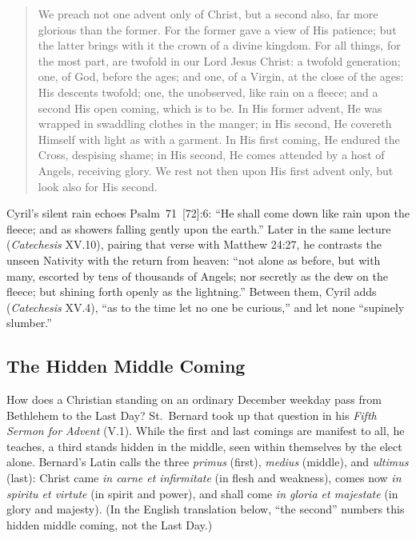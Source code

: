 \begin{quote}
We preach not one advent only of Christ, but a second also, far more
glorious than the former. For the former gave a view of His patience; but
the latter brings with it the crown of a divine kingdom. For all things,
for the most part, are twofold in our Lord Jesus Christ: a twofold
generation; one, of God, before the ages; and one, of a Virgin, at the
close of the ages: His descents twofold; one, the unobserved, like rain on
a fleece; and a second His open coming, which is to be. In His former
advent, He was wrapped in swaddling clothes in the manger; in His second,
He covereth Himself with light as with a garment. In His first coming, He
endured the Cross, despising shame; in His second, He comes attended by a
host of Angels, receiving glory. We rest not then upon His first advent
only, but look also for His second.
\end{quote}

Cyril's silent rain echoes Psalm~71~[72]:6: ``He shall come down like rain
upon the fleece; and as showers falling gently upon the earth.'' Later in
the same lecture (\textit{Catechesis} XV.10), pairing that verse with
Matthew 24:27, he contrasts the unseen Nativity with the return from heaven:
``not alone as before, but with many, escorted by tens of thousands of
Angels; nor secretly as the dew on the fleece; but shining forth openly as
the lightning.'' Between them, Cyril adds (\textit{Catechesis} XV.4), ``as
to the time let no one be curious,'' and let none ``supinely slumber.''

\subsection{The Hidden Middle Coming}

How does a Christian standing on an ordinary December weekday pass from
Bethlehem to the Last Day? St.~Bernard took up that question in his
\textit{Fifth Sermon for Advent} (V.1). While the first and last comings
are manifest to all, he teaches, a third stands hidden in the middle, seen
within themselves by the elect alone. Bernard's Latin calls the three
\textit{primus} (first), \textit{medius} (middle), and \textit{ultimus}
(last): Christ came \textit{in carne et infirmitate} (in flesh and
weakness), comes now \textit{in spiritu et virtute} (in spirit and power),
and shall come \textit{in gloria et majestate} (in glory and majesty). (In
the English translation below, ``the second'' numbers this hidden middle
coming, not the Last Day.)

